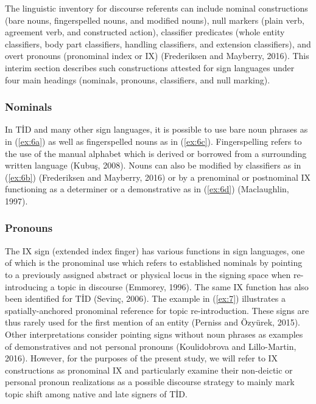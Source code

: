 \documentclass[]{elsarticle} %
\begin{document}
The linguistic inventory for discourse referents can include nominal
constructions (bare nouns, fingerspelled nouns, and modified nouns),
null markers (plain verb, agreement verb, and constructed action),
classifier predicates (whole entity classifiers, body part classifiers,
handling classifiers, and extension classifiers), and overt pronouns
(pronominal index or IX) (Frederiksen and Mayberry, 2016). This interim
section describes such constructions attested for sign languages under
four main headings (nominals, pronouns, classifiers, and null marking).

\hypertarget{nominals}{%
\subsubsection{Nominals}\label{nominals}}

In TİD and many other sign languages, it is possible to use bare noun
phrases as in (\ref{ex:6a}) as well as fingerspelled nouns as in
(\ref{ex:6c}). Fingerspelling refers to the use of the manual alphabet
which is derived or borrowed from a surrounding written language (Kubuş,
2008). Nouns can also be modified by classifiers as in (\ref{ex:6b})
(Frederiksen and Mayberry, 2016) or by a prenominal or postnominal IX
functioning as a determiner or a demonstrative as in (\ref{ex:6d})
(Maclaughlin, 1997).

\hypertarget{pronouns}{%
\subsubsection{Pronouns}\label{pronouns}}

The IX sign (extended index finger) has various functions in sign
languages, one of which is the pronominal use which refers to
established nominals by pointing to a previously assigned abstract or
physical locus in the signing space when re-introducing a topic in
discourse (Emmorey, 1996). The same IX function has also been identified
for TİD (Sevinç, 2006). The example in (\ref{ex:7}) illustrates a
spatially-anchored pronominal reference for topic re-introduction. These
signs are thus rarely used for the first mention of an entity (Perniss
and Özyürek, 2015). Other interpretations consider pointing signs
without noun phrases as examples of demonstratives and not personal
pronouns (Koulidobrova and Lillo-Martin, 2016). However, for the
purposes of the present study, we will refer to IX constructions as
pronominal IX and particularly examine their non-deictic or personal
pronoun realizations as a possible discourse strategy to mainly mark
topic shift among native and late signers of TİD.
\end{document}
